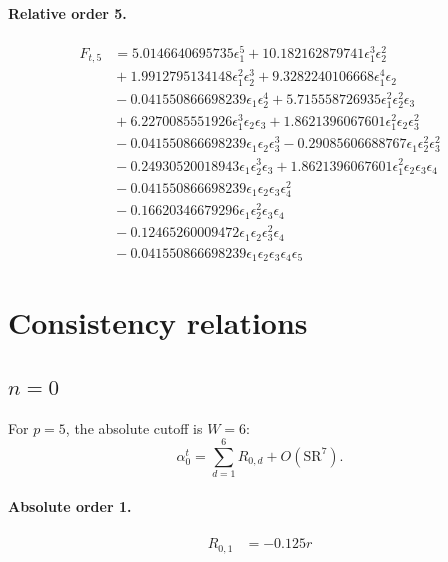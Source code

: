 \documentclass[10pt]{article}
\begin{document}
\paragraph{Relative order 5.}
\begin{align*}
F_{t,5} &= 5.0146640695735 \epsilon_{1}^{5} + 10.182162879741 \epsilon_{1}^{3} \epsilon_{2}^{2} \\
&{}  + 1.9912795134148 \epsilon_{1}^{2} \epsilon_{2}^{3} + 9.3282240106668 \epsilon_{1}^{4} \epsilon_{2} \\
&{}  - 0.041550866698239 \epsilon_{1} \epsilon_{2}^{4} + 5.715558726935 \epsilon_{1}^{2} \epsilon_{2}^{2} \epsilon_{3} \\
&{}  + 6.2270085551926 \epsilon_{1}^{3} \epsilon_{2} \epsilon_{3} + 1.8621396067601 \epsilon_{1}^{2} \epsilon_{2} \epsilon_{3}^{2} \\
&{}  - 0.041550866698239 \epsilon_{1} \epsilon_{2} \epsilon_{3}^{3} - 0.29085606688767 \epsilon_{1} \epsilon_{2}^{2} \epsilon_{3}^{2} \\
&{}  - 0.24930520018943 \epsilon_{1} \epsilon_{2}^{3} \epsilon_{3} + 1.8621396067601 \epsilon_{1}^{2} \epsilon_{2} \epsilon_{3} \epsilon_{4} \\
&{}  - 0.041550866698239 \epsilon_{1} \epsilon_{2} \epsilon_{3} \epsilon_{4}^{2} \\
&{}  - 0.16620346679296 \epsilon_{1} \epsilon_{2}^{2} \epsilon_{3} \epsilon_{4} \\
&{}  - 0.12465260009472 \epsilon_{1} \epsilon_{2} \epsilon_{3}^{2} \epsilon_{4} \\
&{}  - 0.041550866698239 \epsilon_{1} \epsilon_{2} \epsilon_{3} \epsilon_{4} \epsilon_{5}
\end{align*}

\section{Consistency relations}
\subsection{$n=0$}
For $p=5$, the absolute cutoff is $W=6$:
\[\alpha_{0}^t=\sum_{d=1}^{6}R_{0,d}+O(\mathrm{SR}^{7}).\]
\paragraph{Absolute order 1.}
\begin{align*}
R_{0,1} &=  - 0.125 r
\end{align*}
\end{document}
